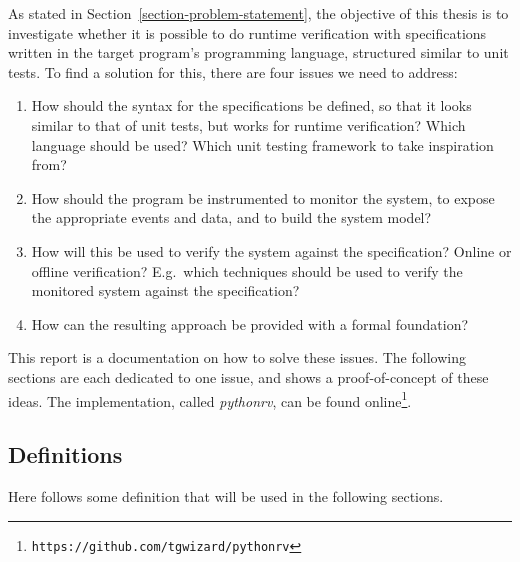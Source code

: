 \documentclass[a4paper,11pt]{kth-mag}
\begin{document}
As stated in Section~\ref{section-problem-statement}, the objective of this
thesis is to investigate whether it is possible to do runtime verification with
specifications written in the target program's programming language, structured
similar to unit tests. To find a solution for this, there are four issues we
need to address:

\begin{enumerate}
	\item How should the syntax for the specifications be defined, so that it
		looks similar to that of unit tests, but works for runtime verification?
		Which language should be used? Which unit testing framework to take
		inspiration from?
	\item How should the program be instrumented to monitor the system, to expose
		the appropriate events and data, and to build the system model?
	\item How will this be used to verify the system against the
		specification? Online or offline verification? E.g.\ which techniques
		should be used to verify the monitored system against the specification?
	\item How can the resulting approach be provided with a formal foundation?
\end{enumerate}

This report is a documentation on how to solve these issues. The following
sections are each dedicated to one issue, and shows a proof-of-concept of these
ideas. The implementation, called \textit{pythonrv}, can be found
online\footnote{\texttt{https://github.com/tgwizard/pythonrv}}.


\subsection{Definitions}

Here follows some definition that will be used in the following sections.
\end{document}
